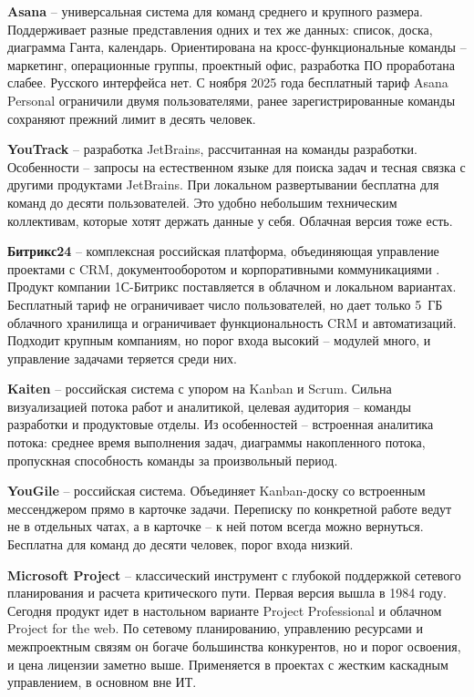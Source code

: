 \textbf{Asana} -- универсальная система для команд среднего и крупного размера. Поддерживает разные представления одних и тех же данных: список, доска, диаграмма Ганта, календарь. Ориентирована на кросс-функциональные команды -- маркетинг, операционные группы, проектный офис, разработка ПО проработана слабее. Русского интерфейса нет. С ноября 2025 года бесплатный тариф Asana Personal ограничили двумя пользователями, ранее зарегистрированные команды сохраняют прежний лимит в десять человек.

\textbf{YouTrack} -- разработка JetBrains, рассчитанная на команды разработки. Особенности -- запросы на естественном языке для поиска задач и тесная связка с другими продуктами JetBrains. При локальном развертывании бесплатна для команд до десяти пользователей. Это удобно небольшим техническим коллективам, которые хотят держать данные у себя. Облачная версия тоже есть.

\textbf{Битрикс24} -- комплексная российская платформа, объединяющая управление проектами с CRM, документооборотом и корпоративными коммуникациями \cite{yougile_review}. Продукт компании 1С-Битрикс поставляется в облачном и локальном вариантах. Бесплатный тариф не ограничивает число пользователей, но дает только 5~ГБ облачного хранилища и ограничивает функциональность CRM и автоматизаций. Подходит крупным компаниям, но порог входа высокий -- модулей много, и управление задачами теряется среди них.

\textbf{Kaiten} -- российская система с упором на Kanban и Scrum. Сильна визуализацией потока работ и аналитикой, целевая аудитория -- команды разработки и продуктовые отделы. Из особенностей -- встроенная аналитика потока: среднее время выполнения задач, диаграммы накопленного потока, пропускная способность команды за произвольный период.

\textbf{YouGile} -- российская система. Объединяет Kanban-доску со встроенным мессенджером прямо в карточке задачи. Переписку по конкретной работе ведут не в отдельных чатах, а в карточке -- к ней потом всегда можно вернуться. Бесплатна для команд до десяти человек, порог входа низкий.

\textbf{Microsoft Project} -- классический инструмент с глубокой поддержкой сетевого планирования и расчета критического пути. Первая версия вышла в 1984 году. Сегодня продукт идет в настольном варианте Project Professional и облачном Project for the web. По сетевому планированию, управлению ресурсами и межпроектным связям он богаче большинства конкурентов, но и порог освоения, и цена лицензии заметно выше. Применяется в проектах с жестким каскадным управлением, в основном вне ИТ.


